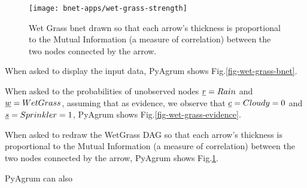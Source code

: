 \begin{figure}[h!]
\centering
\texttt{[image: bnet-apps/wet-grass-strength]}
\caption{Wet Grass bnet drawn so that each arrow's thickness
is proportional to the Mutual Information (a measure of
correlation) between the two nodes connected by the arrow.}
\label{fig-wet-grass-strength}
\end{figure}


When asked to display the input data, PyAgrum shows Fig.\ref{fig-wet-grass-bnet}.



When asked to  the probabilities of unobserved nodes $\rvr=Rain$
and $\rvw=WetGrass$,
assuming that as evidence, we observe that $\rvc=Cloudy=0$ and $\rvs=Sprinkler=1$, PyAgrum shows Fig.\ref{fig-wet-grass-evidence}.

When asked to redraw the WetGrass DAG so that each arrow's thickness
is proportional to the Mutual Information (a measure of
correlation) between the two nodes connected by the arrow,
PyAgrum shows Fig.\ref{fig-wet-grass-strength}.


PyAgrum can also  

